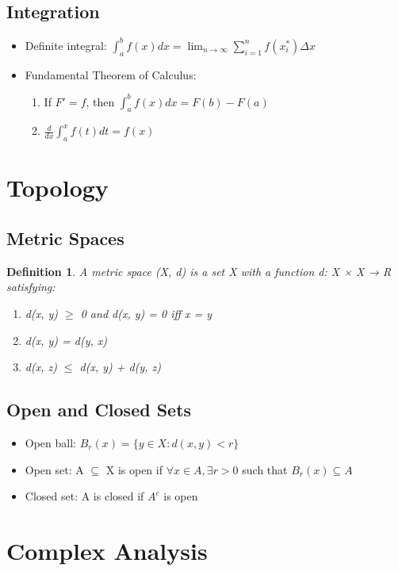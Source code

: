 \documentclass[10pt,a4paper,twocolumn]{article}
\newtheorem{definition}[theorem]{Definition}
\begin{document}
\subsection{Integration}
\begin{itemize}[leftmargin=*]
\item Definite integral: $\int_a^b f(x) dx = \lim_{n \to \infty} \sum_{i=1}^n f(x_i^*) \Delta x$
\item Fundamental Theorem of Calculus:
  \begin{enumerate}[leftmargin=*]
  \item If $F' = f$, then $\int_a^b f(x) dx = F(b) - F(a)$
  \item $\frac{d}{dx} \int_a^x f(t) dt = f(x)$
  \end{enumerate}
\end{itemize}

\section{Topology}

\subsection{Metric Spaces}
\begin{definition}
A metric space (X, d) is a set X with a function d: X × X → R satisfying:
\begin{enumerate}[leftmargin=*]
\item d(x, y) $\geq$ 0 and d(x, y) = 0 iff x = y
\item d(x, y) = d(y, x)
\item d(x, z) $\leq$ d(x, y) + d(y, z)
\end{enumerate}
\end{definition}

\subsection{Open and Closed Sets}
\begin{itemize}[leftmargin=*]
\item Open ball: $B_r(x) = \{y \in X : d(x, y) < r\}$
\item Open set: A $\subseteq$ X is open if $\forall x \in A, \exists r > 0$ such that $B_r(x) \subseteq A$
\item Closed set: A is closed if $A^c$ is open
\end{itemize}

\section{Complex Analysis}
\end{document}
